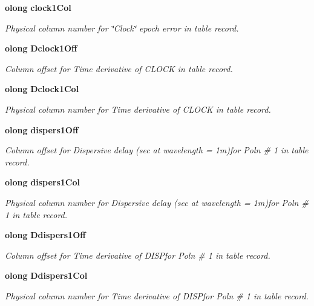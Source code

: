 \begin{CompactItemize}
{\bf olong} {\bf clock1Col}
\begin{CompactList}\small\item\em Physical column number for \char`\"{}Clock\char`\"{} epoch error in table record. \item\end{CompactList}\item 
{\bf olong} {\bf Dclock1Off}
\begin{CompactList}\small\item\em Column offset for Time derivative of CLOCK in table record. \item\end{CompactList}\item 
{\bf olong} {\bf Dclock1Col}
\begin{CompactList}\small\item\em Physical column number for Time derivative of CLOCK in table record. \item\end{CompactList}\item 
{\bf olong} {\bf dispers1Off}
\begin{CompactList}\small\item\em Column offset for Dispersive delay (sec at wavelength = 1m)for Poln \# 1 in table record. \item\end{CompactList}\item 
{\bf olong} {\bf dispers1Col}
\begin{CompactList}\small\item\em Physical column number for Dispersive delay (sec at wavelength = 1m)for Poln \# 1 in table record. \item\end{CompactList}\item 
{\bf olong} {\bf Ddispers1Off}
\begin{CompactList}\small\item\em Column offset for Time derivative of DISPfor Poln \# 1 in table record. \item\end{CompactList}\item 
{\bf olong} {\bf Ddispers1Col}
\begin{CompactList}\small\item\em Physical column number for Time derivative of DISPfor Poln \# 1 in table record. \item\end{CompactList}\item 

\end{CompactItemize}
